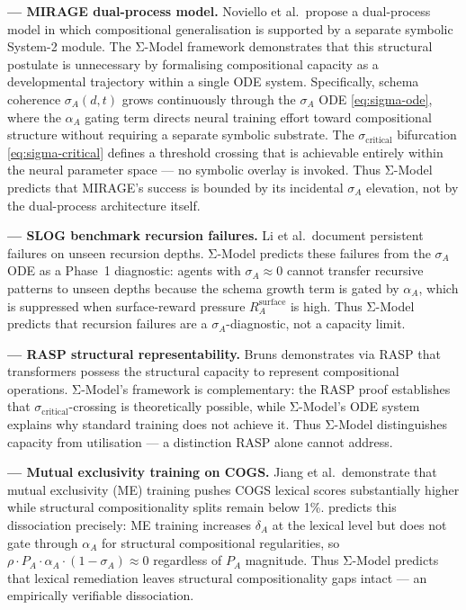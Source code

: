 \textbf{\cite{noviello2025neuroscienceinspiredualprocess} --- MIRAGE dual-process model.}
Noviello et al.\ propose a dual-process model in which compositional
generalisation is supported by a separate symbolic System-2 module. The Σ-Model framework demonstrates that
this structural postulate is unnecessary by formalising compositional
capacity as a developmental trajectory within a single ODE system.
Specifically, schema coherence $\sigma_A(d,t)$ grows continuously
through the $\sigma_A$ ODE \eqref{eq:sigma-ode}, where the
$\alpha_A$ gating term directs neural training effort toward
compositional structure without requiring a separate symbolic substrate.
The $\sigma_{\text{critical}}$ bifurcation \eqref{eq:sigma-critical}
defines a threshold crossing that is achievable entirely within the
neural parameter space --- no symbolic overlay is invoked.
Thus Σ-Model predicts that MIRAGE's success is bounded by its incidental
$\sigma_A$ elevation, not by the dual-process architecture itself.

\textbf{\cite{li2023slogstructuralgeneralizationbenchmark} --- SLOG benchmark recursion failures.}
Li et al.\ document persistent failures on unseen recursion depths.
Σ-Model predicts these failures from the $\sigma_A$ ODE as a Phase~1
diagnostic: agents with $\sigma_A \approx 0$ cannot transfer recursive
patterns to unseen depths because the schema growth term is gated by
$\alpha_A$, which is suppressed when surface-reward pressure
$R_A^{\text{surface}}$ is high.
Thus Σ-Model predicts that recursion failures are a
$\sigma_A$-diagnostic, not a capacity limit.

\textbf{\cite{bruns2025exploringcompositionalgeneralizationin} --- RASP structural representability.}
Bruns demonstrates via RASP that transformers possess the structural capacity
to represent compositional operations. Σ-Model's framework is
complementary: the RASP proof establishes that
$\sigma_{\text{critical}}$-crossing is theoretically possible, while
Σ-Model's ODE system explains why standard training does not achieve it.
Thus Σ-Model distinguishes capacity from utilisation --- a distinction
RASP alone cannot address.

\textbf{\cite{jiang2022mutualexclusivity} --- Mutual exclusivity training on COGS.}
Jiang et al.\ demonstrate that mutual exclusivity (ME) training pushes
COGS lexical scores substantially higher while structural
compositionality splits remain below 1\%. %
predicts this dissociation precisely: ME training increases
$\delta_A$ at the lexical level but does not gate through $\alpha_A$
for structural compositional regularities, so
$\rho \cdot P_A \cdot \alpha_A \cdot (1 - \sigma_A) \approx 0$
regardless of $P_A$ magnitude.
Thus Σ-Model predicts that lexical remediation leaves structural
compositionality gaps intact --- an empirically verifiable dissociation.

